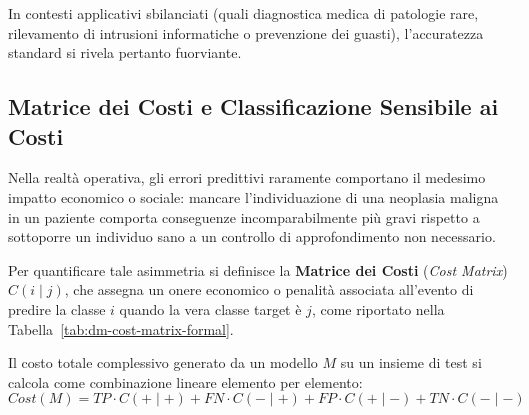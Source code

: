 In contesti applicativi sbilanciati (quali diagnostica medica di patologie rare, rilevamento di intrusioni informatiche o prevenzione dei guasti), l'accuratezza standard si rivela pertanto fuorviante.

\FloatBarrier
\subsection{Matrice dei Costi e Classificazione Sensibile ai Costi}
\label{subsec:dm-cost-matrix}

Nella realtà operativa, gli errori predittivi raramente comportano il medesimo impatto economico o sociale: mancare l'individuazione di una neoplasia maligna in un paziente comporta conseguenze incomparabilmente più gravi rispetto a sottoporre un individuo sano a un controllo di approfondimento non necessario.

Per quantificare tale asimmetria si definisce la \textbf{Matrice dei Costi} (\textit{Cost Matrix}) $C(i \mid j)$, che assegna un onere economico o penalità associata all'evento di predire la classe $i$ quando la vera classe target è $j$, come riportato nella Tabella~\ref{tab:dm-cost-matrix-formal}.

\begin{table}[H]
\centering
\caption{Matrice formale dei costi di classificazione $C(i \mid j)$.}
\label{tab:dm-cost-matrix-formal}
\vspace{2mm}
\end{table}

Il costo totale complessivo generato da un modello $M$ su un insieme di test si calcola come combinazione lineare elemento per elemento:
\begin{equation}
    Cost(M) = TP \cdot C(+ \mid +) + FN \cdot C(- \mid +) + FP \cdot C(+ \mid -) + TN \cdot C(- \mid -)
\end{equation}

